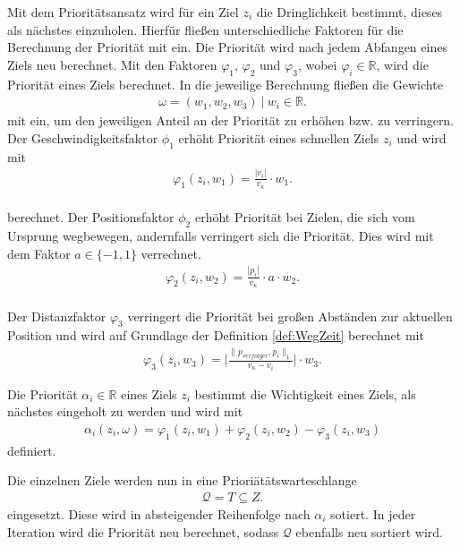 \documentclass[german,version-2019-11]{uzl-thesis}
\begin{document}
Mit dem Prioritätsansatz wird für ein Ziel $z_i$ die Dringlichkeit bestimmt, dieses als nächstes einzuholen. Hierfür fließen unterschiedliche Faktoren für die Berechnung der Priorität mit ein. Die Priorität wird nach jedem Abfangen eines Ziels neu berechnet. Mit den Faktoren $\varphi_1$, $\varphi_2$ und $\varphi_3$, wobei $\varphi_i\in\mathbb{R}$, wird die Priorität eines Ziels berechnet. In die jeweilige Berechnung fließen die Gewichte
\begin{align*}
\omega = (w_1, w_2 ,w_3)~|~w_i \in\mathbb{R}.
\end{align*}
mit ein, um den jeweiligen Anteil an der Priorität zu erhöhen bzw. zu verringern.\\
Der Geschwindigkeitsfaktor $\phi_1$ erhöht Priorität eines schnellen Ziels $z_i$ und wird mit 
\begin{align}
\varphi_1(z_i, w_1) = \frac{|v_i|}{v_{\kappa}}\cdot w_1.
\end{align}\\
berechnet.
\label{def:FaktorPos}
Der Positionsfaktor $\phi_2$ erhöht Priorität bei Zielen, die sich vom Ursprung wegbewegen, andernfalls verringert sich die Priorität. Dies wird mit dem Faktor $a\in\{-1,1\}$ verrechnet.
\begin{align}
\varphi_2(z_i, w_2) = \frac{|p_i|}{v_{\kappa}}\cdot a \cdot w_2.
\end{align}\\
Der Distanzfaktor $\varphi_3$ verringert die Priorität bei großen Abständen zur aktuellen Position und wird auf Grundlage der Definition \ref{def:WegZeit} berechnet mit
\begin{align}
\varphi_3(z_i, w_3) = \bigg\vert\frac{\|p_{verfolger},p_i\|_1}{v_{\kappa}-v_i}\bigg\vert \cdot w_3.
\end{align}
\begin{definition}
Die Priorität $\alpha_i\in\mathbb{R}$ eines Ziels $z_i$ bestimmt die Wichtigkeit eines Ziels, als nächstes eingeholt zu werden und wird mit
\begin{align*}
\alpha_i(z_i, \omega) = \varphi_1(z_i,w_1) + \varphi_2(z_i,w_2) - \varphi_3(z_i,w_3)
\end{align*}
definiert.
\end{definition}\noindent
Die einzelnen Ziele werden nun in eine Prioriätätswarteschlange
\begin{align*}
\mathcal{Q} = T\subseteq Z.
\end{align*}
eingesetzt. Diese wird in absteigender Reihenfolge nach $\alpha_i$ sotiert. In jeder Iteration wird die Priorität neu berechnet, sodass $\mathcal{Q}$ ebenfalls neu sortiert wird.
\end{document}
